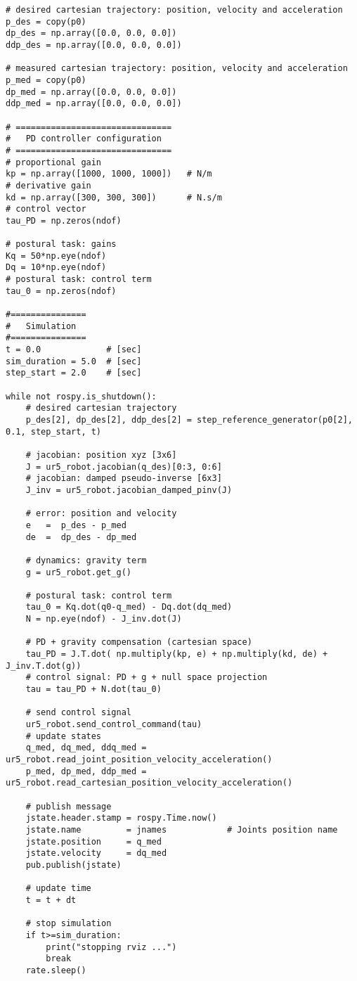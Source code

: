 \begin{lstlisting}
# desired cartesian trajectory: position, velocity and acceleration
p_des = copy(p0)
dp_des = np.array([0.0, 0.0, 0.0])
ddp_des = np.array([0.0, 0.0, 0.0])

# measured cartesian trajectory: position, velocity and acceleration
p_med = copy(p0)
dp_med = np.array([0.0, 0.0, 0.0])
ddp_med = np.array([0.0, 0.0, 0.0])

# ===============================
#   PD controller configuration
# ===============================
# proportional gain
kp = np.array([1000, 1000, 1000])   # N/m
# derivative gain   
kd = np.array([300, 300, 300])      # N.s/m
# control vector
tau_PD = np.zeros(ndof)    

# postural task: gains
Kq = 50*np.eye(ndof)
Dq = 10*np.eye(ndof)
# postural task: control term
tau_0 = np.zeros(ndof)

#===============
#   Simulation
#===============
t = 0.0             # [sec] 
sim_duration = 5.0  # [sec]
step_start = 2.0    # [sec]

while not rospy.is_shutdown():
    # desired cartesian trajectory
    p_des[2], dp_des[2], ddp_des[2] = step_reference_generator(p0[2], 0.1, step_start, t)

    # jacobian: position xyz [3x6]
    J = ur5_robot.jacobian(q_des)[0:3, 0:6]  
    # jacobian: damped pseudo-inverse [6x3]
    J_inv = ur5_robot.jacobian_damped_pinv(J)   

    # error: position and velocity
    e 	=  p_des - p_med
    de 	=  dp_des - dp_med    

    # dynamics: gravity term
    g = ur5_robot.get_g()

    # postural task: control term
    tau_0 = Kq.dot(q0-q_med) - Dq.dot(dq_med)
    N = np.eye(ndof) - J_inv.dot(J)
    
    # PD + gravity compensation (cartesian space)
    tau_PD = J.T.dot( np.multiply(kp, e) + np.multiply(kd, de) + J_inv.T.dot(g))
    # control signal: PD + g + null space projection
    tau = tau_PD + N.dot(tau_0)
    
    # send control signal
    ur5_robot.send_control_command(tau)
    # update states
    q_med, dq_med, ddq_med = ur5_robot.read_joint_position_velocity_acceleration()
    p_med, dp_med, ddp_med = ur5_robot.read_cartesian_position_velocity_acceleration()

    # publish message
    jstate.header.stamp = rospy.Time.now()
    jstate.name 		= jnames			# Joints position name
    jstate.position 	= q_med
    jstate.velocity 	= dq_med
    pub.publish(jstate)

    # update time
    t = t + dt

    # stop simulation
    if t>=sim_duration:
        print("stopping rviz ...")
        break
    rate.sleep()
\end{lstlisting}




